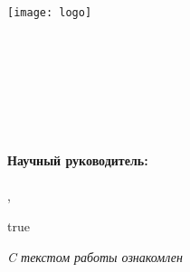 

\thispagestyle{titlepagestyle}
\begin{SingleSpace}
\texttt{[image: logo]}\\
\newline
\begin{center}
{\small
\MakeUppercase{\Univer}\\
\MakeUppercase{\Faculty}\\
\MakeUppercase{\Department}\\[4\baselineskip]
}
\Author\\
\textbf{
  \Title\\[2\baselineskip]
}
\MakeUppercase{\WorkType}\\[3\baselineskip]
\end{center}

\vspace*{2\baselineskip}

\noindent
\ifx\SciAdvisor\empty
%
\else
    \begin{minipage}{0.4\textwidth}
    \phantom{MMMM}
    \end{minipage}
    \begin{minipage}{0.58\textwidth}
            \SingleSpacing
            \textbf{Научный руководитель:}\\
            \Position
            \ifx\AcademicDegree\empty
                \\%
            \else
                , \AcademicDegree\\%
            \SciAdvisor
            \fi
    \end{minipage}

    \def\True{true}
    \ifx\EnableSign\True
    \vspace*{4\baselineskip}
    \begin{minipage}{0.4\textwidth}
    \phantom{MMMM}
    \end{minipage}
    \begin{minipage}{0.58\textwidth}
    {\small\textit{C текстом работы ознакомлен}}\\[2\baselineskip]
    \underline{\phantom{МММММММММММMM}} \SciAdvisorShort
    \end{minipage}
    \fi
\fi

\end{SingleSpace}
